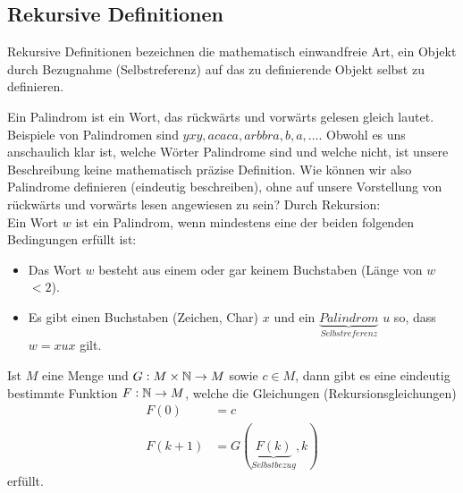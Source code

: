 \subsection{Rekursive Definitionen}

Rekursive Definitionen bezeichnen die mathematisch einwandfreie Art, ein Objekt durch Bezugnahme (Selbstreferenz) auf das zu definierende Objekt selbst zu definieren.

\begin{example}
    Ein Palindrom ist ein Wort, das rückwärts und vorwärts gelesen gleich lautet. Beispiele von Palindromen sind $yxy,acaca,arbbra,b,a,\dots$. Obwohl es uns anschaulich klar ist, welche Wörter Palindrome sind und welche nicht, ist unsere Beschreibung keine mathematisch präzise Definition. Wie können wir also Palindrome definieren (eindeutig beschreiben), ohne auf unsere Vorstellung von rückwärts und vorwärts lesen angewiesen zu sein? Durch Rekursion:\\
    Ein Wort $w$ ist ein Palindrom, wenn mindestens eine der beiden folgenden Bedingungen erfüllt ist:
    \begin{itemize}
        \item Das Wort $w$ besteht aus einem oder gar keinem Buchstaben (Länge von $w$ $<2$).
        \item Es gibt einen Buchstaben (Zeichen, Char) $x$ und ein $\underbrace{Palindrom}_{Selbstreferenz}$ $u$ so, dass $w=xux$ gilt.
    \end{itemize}
\end{example}

\begin{theorem}
    Ist $M$ eine Menge und $G:M\times\mathbb{N}\rightarrow M$ sowie $c\in M$, dann gibt es eine eindeutig bestimmte Funktion $F:\mathbb{N}\rightarrow M$, welche die Gleichungen (Rekursionsgleichungen)
    \begin{align*}
        F(0)&=c\\
        F(k+1)&=G(\underbrace{F(k)}_{Selbstbezug},k)
    \end{align*}
    erfüllt.
\end{theorem}

